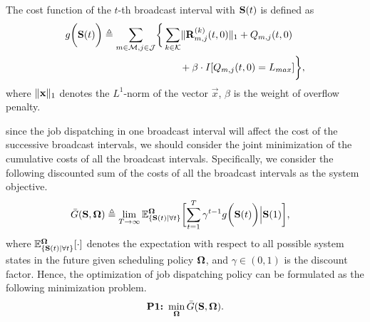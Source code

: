\begin{definition}
    The cost function of the $t$-th broadcast interval with $\mathbf{S}(t)$ is defined as
    {\small
    \begin{align}
        g\Paren{\Stat(t)} \define
            \sum_{m\in\esSet,j\in\jSpace}
            \Brace{&
                \sum_{k\in\apSet} \Inorm{\vec{R}^{(k)}_{m,j}(t,0)} + Q_{m,j}(t,0)
                \nonumber\\
                &~~~~~+ \beta \cdot I[Q_{m,j}(t,0)=L_{max}]
            },
    \end{align}
    }%
    where $\lVert\mathbf{x}\|_1$ denotes the $L^1$-norm of the vector $\vec{x}$, $\beta$ is the weight of overflow penalty.
\end{definition}

since the job dispatching in one broadcast interval will affect the cost of the successive broadcast intervals, we should consider the joint minimization of the cumulative costs of all the broadcast intervals.
Specifically, we consider the following discounted sum of the costs of all the broadcast intervals as the system objective.
{\small
\begin{align}
    &\bar{G}(\Stat, \Policy) \define
    \lim_{T \to \infty} \mathbb{E}^{\Policy}_{\set{\Stat(t)|\forall t}}
    \Bracket{
        \sum_{t=1}^{T} \gamma^{t-1} g\Paren{\Stat(t)} \Big| \Stat(1)
    },
\end{align}
}%
where $\mathbb{E}^{\boldsymbol{\Omega}}_{\{\mathbf{S}(t)|\forall t\}}[\cdot]$ denotes the expectation with respect to all possible system states in the future given scheduling policy $\boldsymbol{\Omega}$, and $\gamma \in (0,1)$ is the discount factor.
Hence, the optimization of job dispatching policy can be formulated as the following minimization problem.
{\small
\begin{align}
    \textbf{P1:}~
    \min_{\boldsymbol{\Omega}} \bar{G}(\mathbf{S}, \boldsymbol{\Omega}).
\end{align}
}%

